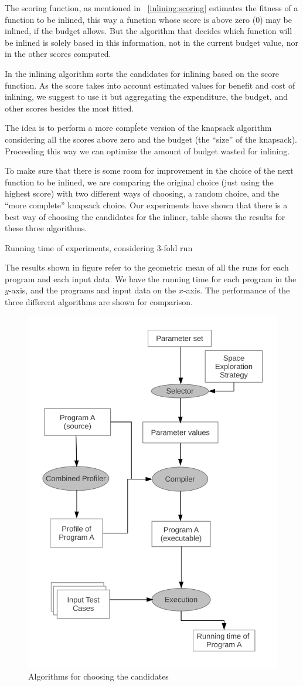
The scoring function, as mentioned in ~\ref{inlining:scoring} estimates the
fitness of a function to be inlined, this way a function whose score is above
zero ($0$) may be inlined, if the budget allows. But the algorithm that decides
which function will be inlined is solely based in this information, not in the
current budget value, nor in the other scores computed.

In \cite{BerubePhD} the inlining algorithm sorts the candidates for inlining
based on the score function. As the score takes into account estimated values for
benefit and cost of inlining, we suggest to use it but aggregating the expenditure,
the budget, and other scores besides the most fitted.

The idea is to perform a more compĺete version of the knapsack algorithm considering
all the scores above zero and the budget (the ``size'' of the knapsack). Proceeding
this way we can optimize the amount of budget wasted for inlining.

To make sure that there is some room for improvement in the choice of the next
function to be inlined, we are comparing the original choice (just using the highest
score) with two different ways of choosing, a random choice, and the ``more complete''
knapsack choice. Our experiments have shown that there is a best way of choosing the
candidates for the inliner, table  shows the results for these
three algorithms.

\begin{table}
  \centering
  \begin{tiny}
  
  \end{tiny}
  \caption{Running time of experiments, considering $3$-fold run}
  \label{tab:choice}
\end{table}

The results shown in figure  refer to the geometric mean of all
the runs for each program and each input data. We have the running time for each program
in the $y$-axis, and the programs and input data on the $x$-axis. The performance of the
three different algorithms are shown for comparison.

\begin{figure}
  \centering
  \includegraphics[width=0.50\linewidth]{Figures/choice}
  \caption{Algorithms for choosing the candidates}
  \label{fig:choice}
\end{figure}
